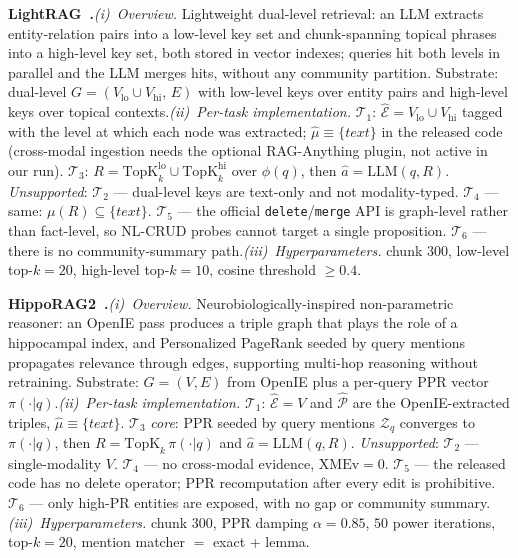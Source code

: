 \documentclass{article}
\begin{document}
\noindent\textbf{LightRAG~\citep{LightRAG}.}\quad\emph{(i)~Overview.} Lightweight dual-level retrieval: an LLM extracts entity-relation pairs into a low-level key set and chunk-spanning topical phrases into a high-level key set, both stored in vector indexes; queries hit both levels in parallel and the LLM merges hits, without any community partition. Substrate: dual-level $G\!=\!(V_{\mathrm{lo}}\!\cup\!V_{\mathrm{hi}},\,E)$ with low-level keys over entity pairs and high-level keys over topical contexts.\quad\emph{(ii)~Per-task implementation.} $\mathcal{T}_1$: $\hat{\mathcal{E}}\!=\!V_{\mathrm{lo}}\!\cup\!V_{\mathrm{hi}}$ tagged with the level at which each node was extracted; $\hat{\mu}\!\equiv\!\{\textit{text}\}$ in the released code (cross-modal ingestion needs the optional RAG-Anything plugin, not active in our run). $\mathcal{T}_3$: $R\!=\!\mathrm{TopK}_{k}^{\mathrm{lo}}\!\cup\!\mathrm{TopK}_{k}^{\mathrm{hi}}$ over $\phi(q)$, then $\hat{a}\!=\!\mathrm{LLM}(q,R)$. \emph{Unsupported}: $\mathcal{T}_2$ — dual-level keys are text-only and not modality-typed. $\mathcal{T}_4$ — same: $\mu(R)\!\subseteq\!\{\textit{text}\}$. $\mathcal{T}_5$ — the official \texttt{delete}/\texttt{merge} API is graph-level rather than fact-level, so NL-CRUD probes cannot target a single proposition. $\mathcal{T}_6$ — there is no community-summary path.\quad\emph{(iii)~Hyperparameters.} chunk $300$, low-level top-$k\!=\!20$, high-level top-$k\!=\!10$, cosine threshold $\geq\!0.4$.

\noindent\textbf{HippoRAG2~\citep{HippoRAG2}.}\quad\emph{(i)~Overview.} Neurobiologically-inspired non-parametric reasoner: an OpenIE pass produces a triple graph that plays the role of a hippocampal index, and Personalized PageRank seeded by query mentions propagates relevance through edges, supporting multi-hop reasoning without retraining. Substrate: $G\!=\!(V,E)$ from OpenIE plus a per-query PPR vector $\pi(\cdot|q)$.\quad\emph{(ii)~Per-task implementation.} $\mathcal{T}_1$: $\hat{\mathcal{E}}\!=\!V$ and $\hat{\mathcal{P}}$ are the OpenIE-extracted triples, $\hat{\mu}\!\equiv\!\{\textit{text}\}$. $\mathcal{T}_3$ \emph{core}: PPR seeded by query mentions $\mathcal{Z}_q$ converges to $\pi(\cdot|q)$, then $R\!=\!\mathrm{TopK}_{k}\,\pi(\cdot|q)$ and $\hat{a}\!=\!\mathrm{LLM}(q,R)$. \emph{Unsupported}: $\mathcal{T}_2$ — single-modality $V$. $\mathcal{T}_4$ — no cross-modal evidence, $\mathrm{XMEv}\!=\!0$. $\mathcal{T}_5$ — the released code has no delete operator; PPR recomputation after every edit is prohibitive. $\mathcal{T}_6$ — only high-PR entities are exposed, with no gap or community summary.\quad\emph{(iii)~Hyperparameters.} chunk $300$, PPR damping $\alpha\!=\!0.85$, $50$ power iterations, top-$k\!=\!20$, mention matcher $=$ exact + lemma.
\end{document}
